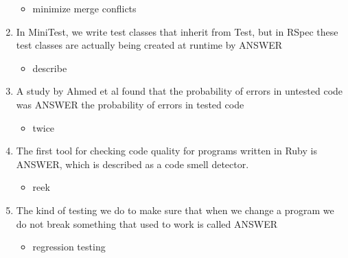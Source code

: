 \documentclass{exam}
\begin{document}
\begin{enumerate}
\begin{itemize}
\item minimize merge conflicts
\end{itemize}
\item In MiniTest, we write test classes that inherit from Test, but in RSpec these test classes are actually being created at runtime by ANSWER
\begin{itemize}
\item describe
\end{itemize}
\item A study by Ahmed et al found that the probability of errors in untested code was ANSWER the probability of errors in tested code
\begin{itemize}
\item twice
\end{itemize}
\item The first tool for checking code quality for programs written in Ruby is ANSWER, which is described as a code smell detector.
\begin{itemize}
\item reek
\end{itemize}
\item The kind of testing we do to make sure that when we change a program we do not break something that used to work is called ANSWER
\begin{itemize}
\item regression testing
\end{itemize}
\end{enumerate}
\end{document}
